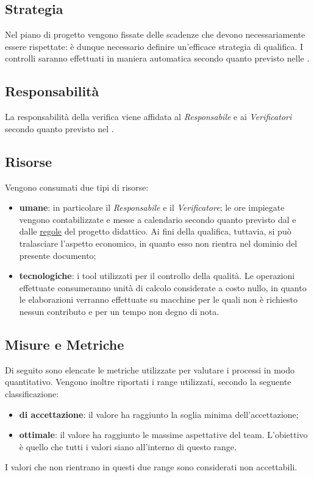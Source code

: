 \subsection{Strategia}
Nel piano di progetto vengono fissate delle scadenze che devono necessariamente essere rispettate: è dunque necessario definire un'efficace strategia di qualifica. I controlli saranno effettuati in maniera automatica secondo quanto previsto nelle \NormeDiProgetto. 

\subsection{Responsabilità}
La responsabilità della verifica viene affidata al \textit{Responsabile} e ai \textit{Verificatori} secondo quanto previsto nel \PianoDiProgetto.

\subsection{Risorse}
Vengono consumati due tipi di risorse:
\begin{itemize}
	\item \textbf{umane}: in particolare il \textit{Responsabile} e il \textit{Verificatore}; le ore impiegate vengono contabilizzate e messe a calendario secondo quanto previsto dal \PianoDiProgetto e dalle \href{http://www.math.unipd.it/~tullio/IS-1/2015/Dispense/PD01.pdf}{regole} del progetto didattico. Ai fini della qualifica, tuttavia, si può tralasciare l'aspetto economico, in quanto esso non rientra nel dominio del presente documento;
		\item \textbf{tecnologiche}: i tool utilizzati per il controllo della qualità. Le operazioni effettuate  consumeranno unità di calcolo considerate a costo nullo, in quanto le elaborazioni verranno effettuate su macchine per le quali non è richiesto nessun contributo e per un tempo non degno di nota.
\end{itemize}

\subsection{Misure e Metriche}\label{MisureMetriche}
Di seguito sono elencate le metriche utilizzate per valutare i processi in modo quantitativo. Vengono inoltre riportati i range utilizzati, secondo la seguente classificazione:
\begin{itemize}
	\item \textbf{di accettazione}: il valore ha raggiunto la soglia minima dell'accettazione;
	\item \textbf{ottimale}: il valore ha raggiunto le massime aspettative del team. L'obiettivo è quello che tutti i valori siano all'interno di questo range.
\end{itemize}
I valori che non rientrano in questi due range sono considerati non accettabili.

